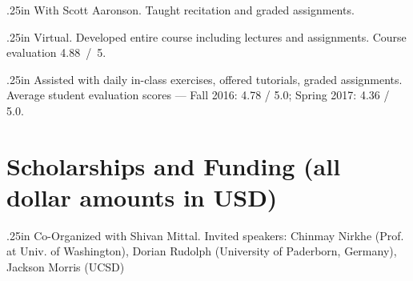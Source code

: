 \documentclass[11pt,letterpaper,serif]{moderncv}
\begin{document}
{
	\begin{adjustwidth}{.25in}{}
	With Scott Aaronson. Taught recitation and graded assignments.
	\end{adjustwidth}
}

{
	\begin{adjustwidth}{.25in}{}
		Virtual.
		Developed entire course including lectures and assignments.
		Course evaluation 4.88~/~5.
	\end{adjustwidth}
}

{
	\begin{adjustwidth}{.25in}{}
		Assisted with daily in-class exercises, offered tutorials, graded assignments. \newline
		Average student evaluation scores --- Fall 2016: 4.78 / 5.0; Spring 2017: 4.36 / 5.0.
	\end{adjustwidth}
}




\section{Scholarships and Funding \hfill{\footnotesize (all dollar amounts in USD)}}

{
\begin{adjustwidth}{.25in}{}
	Co-Organized with Shivan Mittal. Invited speakers: Chinmay Nirkhe (Prof. at Univ. of Washington), Dorian Rudolph (University of Paderborn, Germany), Jackson Morris (UCSD)
\end{adjustwidth}
}
\end{document}
